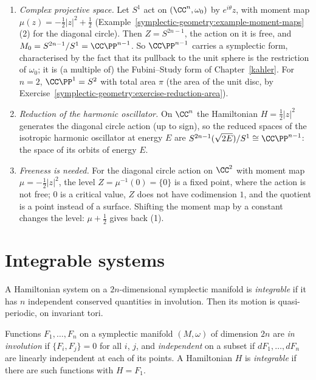 \begin{example}\label{symplectic-geometry:example-reduction}
\begin{enumerate}
\item \emph{Complex projective space.} Let $S^1$ act on $(\CC^n, \omega_0)$ by $e^{i\theta}z$, with moment map $\mu(z) = -\frac12|z|^2 + \frac12$ (Example~\ref{symplectic-geometry:example-moment-maps}(2) for the diagonal
circle). Then $Z = S^{2n-1}$, the action on it is free, and $M_0 = S^{2n-1}/S^1 = \CC\PP^{n-1}$. So $\CC\PP^{n-1}$ carries a symplectic form, characterised by the fact that its pullback to the unit sphere is the
restriction of $\omega_0$; it is (a multiple of) the Fubini--Study form of Chapter~\ref{kahler}. For $n = 2$, $\CC\PP^1 = S^2$ with total area $\pi$ (the area of the unit disc, by Exercise~\ref{symplectic-geometry:exercise-reduction-area}).
\item \emph{Reduction of the harmonic oscillator.} On $\CC^n$ the Hamiltonian $H = \frac12|z|^2$ generates the diagonal circle action (up to sign), so the reduced spaces of the isotropic harmonic oscillator at energy $E$ are
$S^{2n-1}(\sqrt{2E})/S^1 \cong \CC\PP^{n-1}$: the space of its orbits of energy $E$.
\item \emph{Freeness is needed.} For the diagonal circle action on $\CC^2$ with moment map $\mu = -\frac12|z|^2$, the level $Z = \mu^{-1}(0) = \{0\}$ is a fixed point, where the action is not free; $0$ is a critical
value, $Z$ does not have codimension $1$, and the quotient is a point instead of a surface. Shifting the moment map by a constant changes the level: $\mu + \frac12$ gives back (1).
\end{enumerate}
\end{example}

\section{Integrable systems}\label{symplectic-geometry:section-integrable}

A Hamiltonian system on a $2n$-dimensional symplectic manifold is \emph{integrable} if it has $n$ independent conserved quantities in involution. Then its motion is quasi-periodic, on invariant tori.

\begin{definition}\label{symplectic-geometry:definition-integrable}
Functions $F_1, \ldots, F_n$ on a symplectic manifold $(M, \omega)$ of dimension $2n$ are \emph{in involution} if $\{F_i, F_j\} = 0$ for all $i$, $j$, and \emph{independent} on a subset if $dF_1, \ldots, dF_n$ are linearly
independent at each of its points. A Hamiltonian $H$ is \emph{integrable} if there are such functions with $H = F_1$.
\end{definition}

